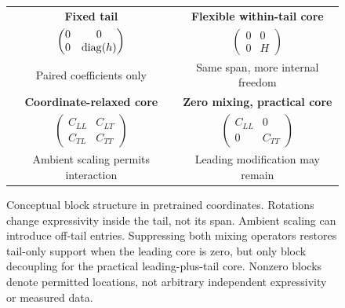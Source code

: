\begin{figure}[t]
\centering
%
\begin{tabular}{cc}
\textbf{Fixed tail} & \textbf{Flexible within-tail core}\\[2pt]
$\begin{pmatrix}0&0\\0&\operatorname{diag}(h)\end{pmatrix}$ &
$\begin{pmatrix}0&0\\0&H\end{pmatrix}$\\[5pt]
Paired coefficients only & Same span, more internal freedom\\[9pt]
\textbf{Coordinate-relaxed core} & \textbf{Zero mixing, practical core}\\[2pt]
$\begin{pmatrix}C_{LL}&C_{LT}\\C_{TL}&C_{TT}\end{pmatrix}$ &
$\begin{pmatrix}C_{LL}&0\\0&C_{TT}\end{pmatrix}$\\[5pt]
Ambient scaling permits interaction & Leading modification may remain
\end{tabular}
\caption{Conceptual block structure in pretrained coordinates. Rotations change expressivity inside the tail, not its span. Ambient scaling can introduce off-tail entries. Suppressing both mixing operators restores tail-only support when the leading core is zero, but only block decoupling for the practical leading-plus-tail core. Nonzero blocks denote permitted locations, not arbitrary independent expressivity or measured data.}
\label{fig:blockschematic}
\end{figure}
